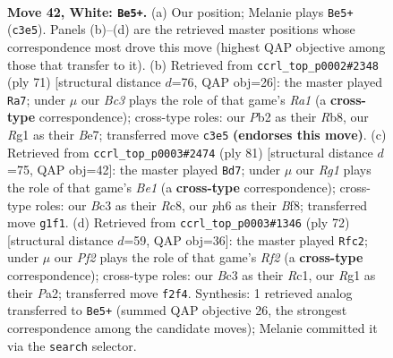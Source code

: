 \documentclass[11pt]{article}
\begin{document}
\clearpage

\begin{figure}[p]\centering
\begin{subfigure}{0.46\textwidth}\centering
\resizebox{\linewidth}{!}{%
\newchessgame
\chessboard[
  setfen={5b1r/r1k3p1/p1p4p/Pp1b1p2/R1p4P/2B1P1P1/1P3P1N/3K2R1 w - b6 0 42},
  showmover=false,
  pgfstyle=straightmove, color=movearrow, markmove={c3-e5}
]}
\caption{}
\end{subfigure}\hfill
\begin{subfigure}{0.46\textwidth}\centering
\resizebox{\linewidth}{!}{%
\newchessgame
\chessboard[
  setfen={rr3k2/1p2bp2/4p1p1/1BPp4/P2P3p/4P2P/K1R3P1/3R4 b - - 2 36},
  showmover=false,
  pgfstyle=straightmove, color=movearrow, markmove={a8-a7}
]}
\caption{}
\end{subfigure}
\\[4pt]
\begin{subfigure}{0.46\textwidth}\centering
\resizebox{\linewidth}{!}{%
\newchessgame
\chessboard[
  setfen={2r1bb2/1p6/p4pk1/3p2p1/P2Br2p/1PPR3P/2N2PP1/3R2K1 b - - 5 41},
  showmover=false,
  pgfstyle=straightmove, color=movearrow, markmove={e8-d7}
]}
\caption{}
\end{subfigure}\hfill
\begin{subfigure}{0.46\textwidth}\centering
\resizebox{\linewidth}{!}{%
\newchessgame
\chessboard[
  setfen={8/r4pbk/2r1b1p1/2pN3p/p2pP2P/3B1PP1/PP3R2/1KR5 w - - 0 37},
  showmover=false,
  pgfstyle=straightmove, color=movearrow, markmove={f2-c2}
]}
\caption{}
\end{subfigure}
\caption{\textbf{Move 42, White: \texttt{Be5+}.} (a) Our position; Melanie plays \texttt{Be5+} (\texttt{c3e5}). Panels (b)--(d) are the retrieved master positions whose correspondence most drove this move (highest QAP objective among those that transfer to it). (b) Retrieved from \texttt{ccrl\_top\_p0002\#2348} (ply 71) [structural distance $d$=76, QAP obj=26]: the master played \texttt{Ra7}; under $\mu$ our \emph{Bc3} plays the role of that game's \emph{Ra1} (a \textbf{cross-type} correspondence); cross-type roles: our \emph{P}b2 as their \emph{R}b8, our \emph{R}g1 as their \emph{B}e7; transferred move \texttt{c3e5} \textbf{(endorses this move)}. (c) Retrieved from \texttt{ccrl\_top\_p0003\#2474} (ply 81) [structural distance $d$=75, QAP obj=42]: the master played \texttt{Bd7}; under $\mu$ our \emph{Rg1} plays the role of that game's \emph{Be1} (a \textbf{cross-type} correspondence); cross-type roles: our \emph{B}c3 as their \emph{R}c8, our \emph{p}h6 as their \emph{B}f8; transferred move \texttt{g1f1}. (d) Retrieved from \texttt{ccrl\_top\_p0003\#1346} (ply 72) [structural distance $d$=59, QAP obj=36]: the master played \texttt{Rfc2}; under $\mu$ our \emph{Pf2} plays the role of that game's \emph{Rf2} (a \textbf{cross-type} correspondence); cross-type roles: our \emph{B}c3 as their \emph{R}c1, our \emph{R}g1 as their \emph{P}a2; transferred move \texttt{f2f4}. Synthesis: 1 retrieved analog transferred to \texttt{Be5+} (summed QAP objective 26, the strongest correspondence among the candidate moves); Melanie committed it via the \texttt{search} selector.}
\label{fig:thought-m82}
\end{figure}
\end{document}
